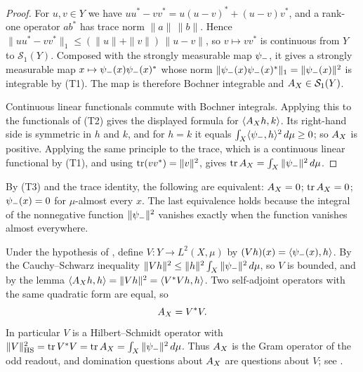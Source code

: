 \begin{proof}
For \(u,v\in Y\) we have \(uu^*-vv^*=u(u-v)^*+(u-v)v^*\), and a
rank-one operator \(ab^*\) has trace norm \(\|a\|\,\|b\|\).  Hence
\(\|uu^*-vv^*\|_1\leq(\|u\|+\|v\|)\,\|u-v\|\), so \(v\mapsto vv^*\) is
continuous from \(Y\) to \(\mathcal S_1(Y)\).  Composed with the
strongly measurable map \(\psi_{-}\), it gives a strongly measurable map
\(x\mapsto\psi_{-}(x)\psi_{-}(x)^*\) whose norm
\(\|\psi_{-}(x)\psi_{-}(x)^*\|_1=\|\psi_{-}(x)\|^2\) is integrable by (T1).
The map is therefore Bochner integrable and \(A_{X}\in\mathcal S_1(Y)\).

Continuous linear functionals commute with Bochner integrals.  Applying
this to the functionals of (T2) gives the displayed formula for
\(\langle A_{X} h,k\rangle\).  Its right-hand side is symmetric in \(h\)
and \(k\), and for \(h=k\) it equals
\(\int_X\langle\psi_{-},h\rangle^2\,d\mu\geq0\); so \(A_{X}\) is positive.
Applying the same principle to the trace, which is a continuous linear
functional by (T1), and using \(\operatorname{tr}(vv^*)=\|v\|^2\), gives
\(\operatorname{tr}A_{X}=\int_X\|\psi_{-}\|^2\,d\mu\).
\end{proof}

By (T3) and the trace identity, the following are equivalent:
\(A_{X}=0\); \(\operatorname{tr}A_{X}=0\); \(\psi_{-}(x)=0\) for \(\mu\)-almost every
\(x\).  The last equivalence holds because the integral of the
nonnegative function \(\|\psi_{-}\|^2\) vanishes exactly when the function
vanishes almost everywhere.

\begin{remark}
\label{rem:duality_confinement:analysis-operator}
Under the hypothesis of ,
define \(V:Y\to L^2(X,\mu)\) by \((Vh)(x)=\langle\psi_{-}(x),h\rangle\).
By the Cauchy--Schwarz inequality
\(\|Vh\|^2\leq\|h\|^2\int_X\|\psi_{-}\|^2\,d\mu\), so \(V\) is bounded, and
by the lemma \(\langle A_{X} h,h\rangle=\|Vh\|^2=\langle V^*Vh,h\rangle\).
Two self-adjoint operators with the same quadratic form are equal, so
\[
  A_{X}=V^*V.
\]
In particular \(V\) is a Hilbert--Schmidt operator with
\(\|V\|_{\mathrm{HS}}^2=\operatorname{tr} V^*V=\operatorname{tr}A_{X}=\int_X\|\psi_{-}\|^2\,d\mu\).
Thus \(A_{X}\) is the Gram operator of the odd readout, and domination
questions about \(A_{X}\) are questions about \(V\); see
.
\end{remark}
